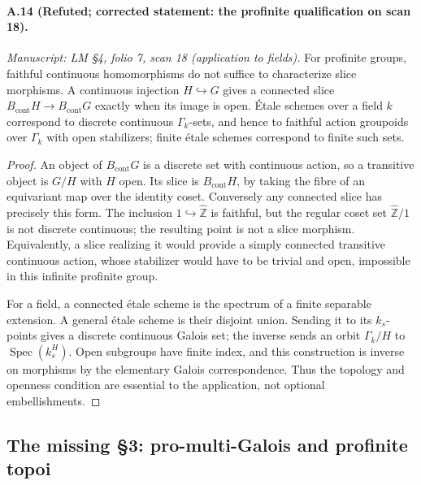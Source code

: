 \paragraph{A.14 (Refuted; corrected statement: the profinite qualification on scan 18).}
\textit{Manuscript: LM \S4, folio 7, scan 18 (application to fields).}
For profinite groups, faithful continuous homomorphisms do not suffice to characterize slice morphisms. A continuous injection $H\hookrightarrow G$ gives a connected slice $B_{\mathrm{cont}}H\to B_{\mathrm{cont}}G$ exactly when its image is open. Étale schemes over a field $k$ correspond to discrete continuous $\Gamma_k$-sets, and hence to faithful action groupoids over $\Gamma_k$ with open stabilizers; finite étale schemes correspond to finite such sets.
\begin{proof}
An object of $B_{\mathrm{cont}}G$ is a discrete set with continuous action, so a transitive object is $G/H$ with $H$ open. Its slice is $B_{\mathrm{cont}}H$, by taking the fibre of an equivariant map over the identity coset. Conversely any connected slice has precisely this form. The inclusion $1\hookrightarrow\widehat{\mathbb Z}$ is faithful, but the regular coset set $\widehat{\mathbb Z}/1$ is not discrete continuous; the resulting point is not a slice morphism. Equivalently, a slice realizing it would provide a simply connected transitive continuous action, whose stabilizer would have to be trivial and open, impossible in this infinite profinite group.

For a field, a connected étale scheme is the spectrum of a finite separable extension. A general étale scheme is their disjoint union. Sending it to its $k_s$-points gives a discrete continuous Galois set; the inverse sends an orbit $\Gamma_k/H$ to $\operatorname{Spec}(k_s^H)$. Open subgroups have finite index, and this construction is inverse on morphisms by the elementary Galois correspondence. Thus the topology and openness condition are essential to the application, not optional embellishments. 
\end{proof}

\subsection{The missing \S3: pro-multi-Galois and profinite topoi}

